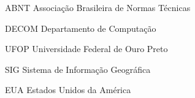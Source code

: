 \begin{siglas}
  \item[ABNT] Associação Brasileira de Normas Técnicas
  \item[DECOM] Departamento de Computação
	\item[UFOP] Universidade Federal de Ouro Preto
	\item[SIG] Sistema de Informação Geográfica 
	\item[EUA] Estados Unidos da América 
\end{siglas}